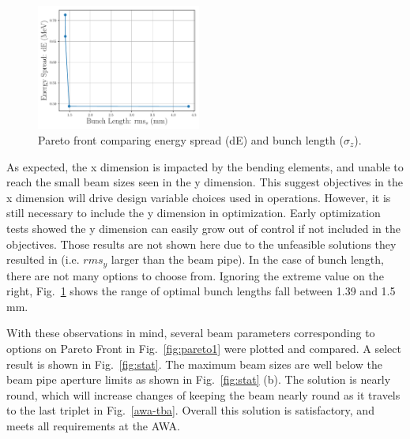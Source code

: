  
\begin{figure}
	\centering
	\includegraphics[width=0.48\textwidth]{../pareto_stat_plots/dE_vs_zrms_pareto_front_quads_before_Q5_zoomout}%
	\caption{Pareto front comparing energy spread (dE) and bunch length ($\sigma_z$). }
	\label{fig:pareto2}
\end{figure}  


As expected, the x dimension is impacted by the bending elements, and unable to reach 
the small beam sizes seen in the y dimension. This suggest objectives in the x 
dimension will drive design variable choices used in operations. 
However, it is still necessary to 
include the y dimension in optimization. Early optimization tests showed the y dimension 
can easily grow out of control if not included in the objectives.
Those results are not shown here due to the unfeasible solutions they resulted in
(i.e. $rms_y$ larger than the beam pipe).
In the case of bunch length, there are not many options to choose from.
Ignoring the extreme value on the right, Fig.~\ref{fig:pareto2} shows the 
range of optimal bunch lengths fall between 1.39 and 1.5 mm.

With these observations in mind, several beam parameters corresponding to
options on Pareto Front in Fig.~\ref{fig:pareto1} were plotted and compared. 
A select result is shown in Fig.~\ref{fig:stat}. 
The maximum beam sizes are well below the beam pipe aperture limits as shown in Fig.~\ref{fig:stat} (b).
The solution is nearly round, which will increase changes of keeping the beam nearly round
as it travels to the last triplet in Fig.~\ref{awa-tba}.
Overall this solution is satisfactory, and meets all requirements at the AWA.


